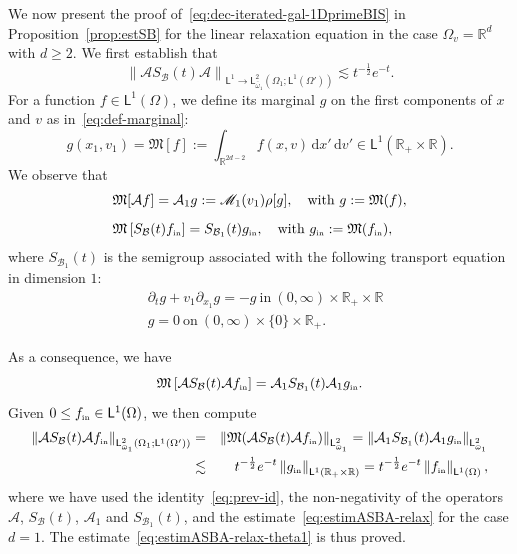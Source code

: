 \documentclass[11pt]{amsart}
\theoremstyle{definition}
\theoremstyle{remark}
\numberwithin{equation}{section}
\newcommand\R{{\mathbb R}}
\def\AA{{\mathcal A}}
\def\BB{{\mathcal B}}
\def\MMM{{\mathscr M}}
\def\fM{{\mathfrak M}}
\newcommand{\dd}{{\, \mathrm d}}
\newcommand{\init}{\text{{\tiny {\rm in}}}}
\newcommand{\sfL}{\mathsf{L}}
\begin{document}
We now present the proof of~\eqref{eq:dec-iterated-gal-1DprimeBIS} in Proposition~\ref{prop:estSB} for the linear relaxation equation in the case $\Omega_v = \mathbb{R}^d$ with $d \geq 2$. We first establish that
\begin{equation}
  \label{eq:estimASBA-relax-theta1}
  \left\| \AA S_\BB(t) \AA \right\|_{\sfL^1  \to \sfL^{2}_{\bar \omega_1}(\Omega_1 ; \sfL^{1}(\Omega'))} \lesssim t^{-\frac{1}{2}}e^{-t}.
\end{equation}
For a function $f \in \sfL^1(\Omega)$, we define its marginal $g$ on the first components of $x$ and $v$ as in~\eqref{eq:def-marginal}:
\begin{equation*}
  g (x_1,v_1) = \fM[f] := \int_{\R^{2d-2}}  f(x,v) \dd x'\dd v' \in \sfL^1(\R_+ \times \R).
\end{equation*}
We observe that
\begin{align*}
  & \fM [\AA f] = \AA_1 g := \MMM_1(v_1) \rho[g], \quad \text{with } g := \fM (f), \\[2mm]
  & \fM \left[S_\BB(t) f_\init \right] = S_{\BB_1}(t) g_\init, \quad \text{with } g_\init := \fM (f_\init),
\end{align*}
where $S_{\BB_1}(t)$ is the semigroup associated with the following transport equation in dimension $1$:
\begin{align*}
  & \partial_t g + v_1 \partial_{x_1} g = - g \ \text{in} \ (0,\infty) \times \mathbb{R}_+ \times \R \\[2mm]
  & g = 0 \ \text{on} \ (0,\infty) \times \{ 0 \} \times \mathbb{R}_+.
\end{align*}

As a consequence, we have
\begin{equation}
  \label{eq:prev-id}
  \fM \left[ \AA S_\BB(t) \AA f_\init \right] = \AA_1  S_{\BB_1}(t) \AA_1 g_\init.
\end{equation}
Given $0 \le f_\init \in \sfL^1(\Omega)$, we then compute
\begin{eqnarray*}
  \left\| \AA S_\BB(t) \AA f_\init \right\|_{\sfL^{2}_{\bar \omega_1}(\Omega_1 ; \sfL^{1}(\Omega'))}
  &= & \left\| \fM ( \AA S_\BB(t) \AA f_\init) \right\|_{\sfL^2_{\bar \omega_1}}  
  = \left\| \AA_1  S_{\BB_1}(t) \AA_1 g_\init  \right\|_{\sfL^2_{\bar \omega_1}} \\
  &\lesssim& t^{-\frac{1}{2}}e^{-t}
        \left\Vert g_\init \right\Vert_{\sfL^1(\R_+ \times \R)} 
  = t^{-\frac{1}{2}}e^{-t}   %
      \left\Vert f_\init \right\Vert_{\sfL^1(\Omega)} ,
 \end{eqnarray*}
 where we have used the identity~\eqref{eq:prev-id}, the non-negativity of the operators $\AA$, $S_\BB(t)$, $\AA_1$ and $S_{\BB_1}(t)$, and the estimate~\eqref{eq:estimASBA-relax} for the case $d=1$. The estimate~\eqref{eq:estimASBA-relax-theta1} is thus proved.
 
\end{document}
